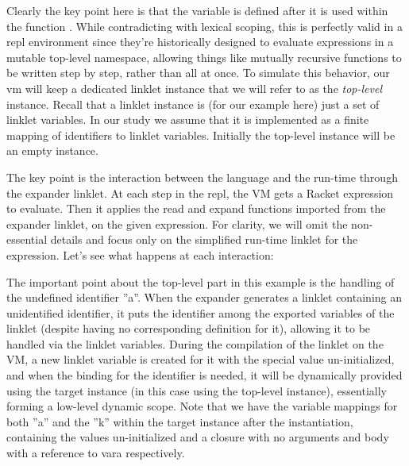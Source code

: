		\begin{paragraph-here}
			Clearly the key point here is that the variable  is defined after it is used within the function . While contradicting with lexical scoping, this is perfectly valid in a \gls{repl} environment since they're historically designed to evaluate expressions in a mutable top-level namespace, allowing things like mutually recursive functions to be written step by step, rather than all at once. To simulate this behavior, our \gls{vm} will keep a dedicated linklet instance that we will refer to as the \emph{top-level} instance. Recall that a linklet instance is (for our example here) just a set of linklet variables. In our study we assume that it is implemented as a finite mapping of identifiers to linklet variables. Initially the top-level instance will be an empty instance.
		\end{paragraph-here}

		\inputFigure{linklets}{toplevel-example-step-by-step-figure}

		\begin{paragraph-here}
			The key point is the interaction between the language and the run-time through the expander linklet. At each step in the repl, the VM gets a Racket expression to evaluate. Then it applies the read and expand functions imported from the expander linklet, on the given expression. For clarity, we will omit the non-essential details and focus only on the simplified run-time linklet for the expression. Let’s see what happens at each interaction:
		\end{paragraph-here}

		\begin{paragraph-here}
			The important point about the top-level part in this example is the handling of the undefined identifier ”a”. When the expander generates a linklet containing an unidentified identifier, it puts the identifier among the exported variables of the linklet (despite having no corresponding definition for it), allowing it to be handled via the linklet variables. During the compilation of the linklet on the VM, a new linklet variable is created for it with the special value un-initialized, and when the binding for the identifier is needed, it will be dynamically provided using the target instance (in this case using the top-level instance), essentially forming a low-level dynamic scope. Note that we have the variable mappings for both ”a” and the ”k” within the target instance after the instantiation, containing the values un-initialized and a closure with no arguments and body with a reference to vara respectively.
		\end{paragraph-here}



